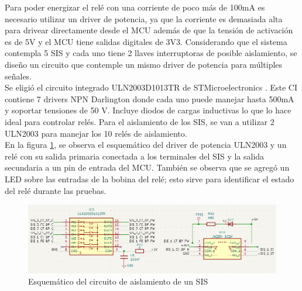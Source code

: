 Para poder energizar el relé con una corriente de poco más de 100mA es necesario utilizar un driver de potencia, ya que la corriente es demasiada alta para drivear directamente desde el MCU además de que la tensión de activación es de 5V y el MCU tiene salidas digitales de 3V3. Considerando que el sistema contempla 5 SIS y cada uno tiene 2 llaves interruptoras de posible aislamiento, se diseño un circuito que contemple un mismo driver de potencia para múltiples señales. \\

Se eligió el circuito integrado ULN2003D1013TR de STMicroelectronics \cite{ULN2003D1013TR}. Este CI contiene 7 drivers NPN Darlington \cite{darlington} donde cada uno puede manejar hasta 500mA y soportar tensiones de 50 V. Incluye diodos de cargas inductivas lo que lo hace ideal para controlar relés. Para el aislamiento de los SIS, se van a utilizar 2 ULN2003 para manejar los 10 relés de aislamiento. \\

En la figura \ref{fig:sis_aislamiento}, se observa el esquemático del driver de potencia ULN2003 y un relé con su salida primaria conectada a los terminales del SIS y la salida secundaria a un pin de entrada del MCU. También se observa que se agregó un LED sobre las entradas de la bobina del relé; esto sirve para identificar el estado del relé durante las pruebas. 



\begin{figure}[H]
    \centering
    \includegraphics[width = \linewidth]{img/sis_aislamiento.png}
    \caption{Esquemático del circuito de aislamiento de un SIS}
    \label{fig:sis_aislamiento}
\end{figure}


